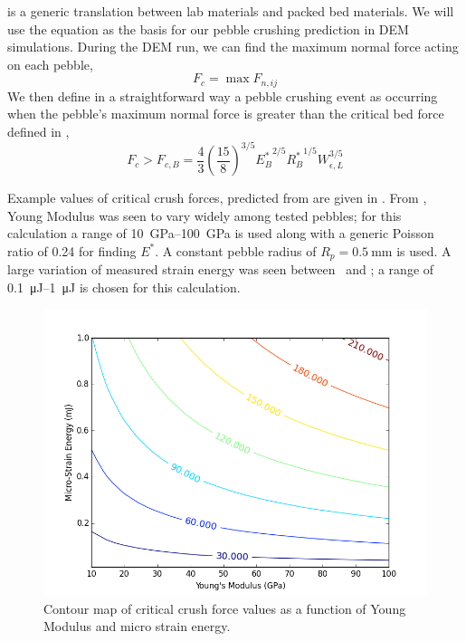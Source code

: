  is a generic translation between lab materials and packed bed materials. We will use the equation as the basis for our pebble crushing prediction in DEM simulations. During the DEM run, we can find the maximum normal force acting on each pebble,
\begin{equation}\label{eq:find_fmax}
	F_{c} = \max F_{n,ij}
\end{equation}
We then define in a straightforward way a pebble crushing event as occurring when the pebble's maximum normal force is greater than the critical bed force defined in ,
\begin{equation}\label{eq:crush-predict}
  F_{c} > F_{c,B} = \frac{4}{3}\left(\frac{15}{8}\right)^{3/5}{E_B^*}^{2/5}{R_B^*}^{1/5}W_{\epsilon,L}^{3/5}
\end{equation}

Example values of critical crush forces, predicted from  are given in . From , Young Modulus was seen to vary widely among tested pebbles; for this calculation a range of \SIrange{10}{100}{\giga\pascal} is used along with a generic Poisson ratio of \num{0.24} for finding $E^*$. A constant pebble radius of $R_p = \SI{0.5}{\milli\meter}$ is used. A large variation of measured strain energy was seen between \lis~and \lit; a range of \SIrange{0.1}{1}{\micro\joule} is chosen for this calculation.

\begin{figure}[ht]
\centering
    \includegraphics[width=\doubleimagewidth]{figures/crush-force-contours.png}
    \caption{Contour map of critical crush force values as a function of Young Modulus and micro strain energy.}
    \label{fig:crush-force-contours}
\end{figure}

